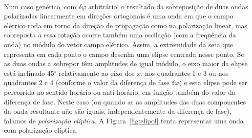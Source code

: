 \begin{description}[leftmargin=0pt,labelindent=0pt]
\item[Caso genérico, $\bm{\delta\varphi}$ qualquer]\hfill\\
Num caso genérico, com $\delta\varphi$ arbitrário, o resultado da sobreposição
de duas ondas polarizadas linearmente em direções ortogonais é uma onda em que o
campo elétrico roda em torno da direção de propagação como na polarização
linear, mas sobreposta a essa rotação ocorre também uma oscilação (com a
frequência da onda) no módulo do vetor campo elétrico. Assim, a extremidade da
seta que representa em cada ponto o campo desenha uma elipse centrada nesse
ponto. Se as duas ondas a sobrepor têm amplitudes de igual módulo, o eixo maior
da elipse está inclinado 45$^\circ$ relativamente ao eixo dos $x$, nos
quadrantes 1 e 3 ou nos quadrantes 2 e 4 (conforme o valor da diferença de fase
$\delta\varphi$) e esta elipse pode ser percorrida no sentido horário ou
anti-horário, em função também do valor da diferença de fase. Neste caso (ou
quando as as amplitudes das duas componentes da onda resultante não são iguais,
independentemente da diferença de fase), falamos de \emph{polarização elíptica.}
A Figura~\ref{fig:elipol} tenta representar uma onda com polarização elíptica.
\begin{figure}[htb]
{\centering
\def\zangle{210}
\def\xangle{-10}
}
\end{figure}
\end{description}
